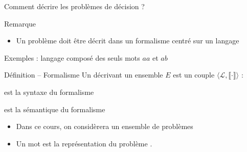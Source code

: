 
\begingroup

\begin{frame}{Comment décrire les problèmes de décision ?}

  \vspace{-1mm}
  \begin{alertblock}{Remarque}
    \begin{itemize}
    \item \vspace{-1mm} Un problème doit être décrit dans un formalisme centré sur un langage
    \end{itemize}
  \end{alertblock}
  
  \vspace{-1mm}
  \begin{exampleblock}{Exemples : langage composé des seuls mots $aa$ et $ab$}
  \end{exampleblock}

  \vspace{-1mm}
  \begin{block}{Définition -- Formalisme}
    Un  décrivant un ensemble $E$ est un couple $\langle \mathcal{L}, \llbracket \cdot \rrbracket \rangle$ :
    \begin{description}
    \item[$\mathcal{L} \in \textsc{lang}$] est la \alert{syntaxe} du formalisme
    \item[$\llbracket \cdot \rrbracket : \mathcal{L} \rightarrow E$] est la \alert{sémantique} du formalisme
    \end{description}
    \begin{itemize}
    \item Dans ce cours, on considèrera  un ensemble de problèmes
    \item Un mot  est la représentation du problème .
    \end{itemize}
  \end{block}
  
\end{frame}

\endgroup
\endinput
